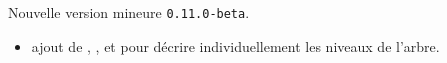 Nouvelle version mineure \verb+0.11.0-beta+.

\begin{itemize}[itemsep=.5em]
    \item {}
    	  ajout de , ,  et  pour décrire individuellement les niveaux de l'arbre.
\end{itemize}


\separation

